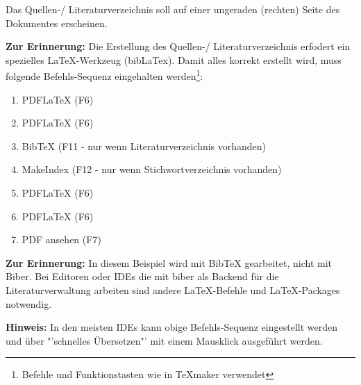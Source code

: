 
Das Quellen-/ Literaturverzeichnis soll auf einer ungeraden (rechten) Seite des Dokumentes erscheinen.


\textbf{Zur Erinnerung:} Die Erstellung des Quellen-/ Literaturverzeichnis erfodert ein spezielles \LaTeX-Werkzeug (bibLaTex). Damit alles korrekt erstellt wird, muss folgende Befehls-Sequenz eingehalten werden\footnote{Befehle und Funktionstasten wie in TeXmaker verwendet}:

\begin{enumerate}
\setlength\itemsep{-1em}
\item PDFLaTeX (F6)
\item PDFLaTeX (F6)
\item BibTeX (F11 - nur wenn Literaturverzeichnis vorhanden)
\item MakeIndex (F12 - nur wenn Stichwortverzeichnis vorhanden)
\item PDFLaTeX (F6)
\item PDFLaTeX (F6)
\item PDF ansehen (F7)
\end{enumerate}

\textbf{Zur Erinnerung:} In diesem Beispiel wird mit BibTeX gearbeitet, nicht mit Biber. Bei Editoren oder IDEs die mit biber als Backend für die Literaturverwaltung arbeiten sind andere \LaTeX-Befehle und \LaTeX-Packages notwendig.

\textbf{Hinweis:} In den meisten IDEs kann obige Befehls-Sequenz eingestellt werden und über "'schnelles Übersetzen"' mit einem Mausklick ausgeführt werden.
